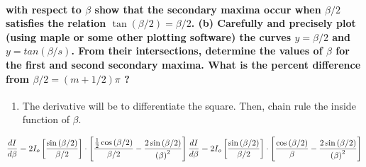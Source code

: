 \documentclass[11pt]{article}
\providecommand{\tightlist}{%
      \setlength{\itemsep}{0pt}\setlength{\parskip}{0pt}}
\begin{document}
\paragraph{\texorpdfstring{with respect to \(\beta\) show that the
secondary maxima occur when \(\beta/2\) satisfies the relation
\(\tan\left(\beta/2\right)=\beta/2\). (b) Carefully and precisely plot
(using maple or some other plotting software) the curves \(y=\beta/2\)
and \(y=tan\left(\beta/s\right)\). From their intersections, determine
the values of \(\beta\) for the first and second secondary maxima. What
is the percent difference from \(\beta/2=(m+1/2)\pi\)
?}{with respect to \textbackslash{}beta show that the secondary maxima occur when \textbackslash{}beta/2 satisfies the relation \textbackslash{}tan\textbackslash{}left(\textbackslash{}beta/2\textbackslash{}right)=\textbackslash{}beta/2. (b) Carefully and precisely plot (using maple or some other plotting software) the curves y=\textbackslash{}beta/2 and y=tan\textbackslash{}left(\textbackslash{}beta/s\textbackslash{}right). From their intersections, determine the values of \textbackslash{}beta for the first and second secondary maxima. What is the percent difference from \textbackslash{}beta/2=(m+1/2)\textbackslash{}pi ?}}\label{with-respect-to-beta-show-that-the-secondary-maxima-occur-when-beta2-satisfies-the-relation-tanleftbeta2rightbeta2.-b-carefully-and-precisely-plot-using-maple-or-some-other-plotting-software-the-curves-ybeta2-and-ytanleftbetasright.-from-their-intersections-determine-the-values-of-beta-for-the-first-and-second-secondary-maxima.-what-is-the-percent-difference-from-beta2m12pi}

\begin{enumerate}
\def\labelenumi{(\alph{enumi})}
\tightlist
\item
  The derivative will be to differentiate the square. Then, chain rule
  the inside function of \(\beta\).
\end{enumerate}

\[\begin{equation}
\frac{dI}{d\beta} = 2I_o\left[\frac{\sin\left(\beta/2\right)}{\beta/2}\right] \cdot \left[\frac{\frac{1}{2}\cos\left(\beta/2\right)}{\beta/2}-\frac{2\sin\left(\beta/2\right)}{\left(\beta\right)^2}\right]
\\
\\
\frac{dI}{d\beta} = 2I_o\left[\frac{\sin\left(\beta/2\right)}{\beta/2}\right] \cdot \left[\frac{\cos\left(\beta/2\right)}{\beta}-\frac{2\sin\left(\beta/2\right)}{\left(\beta\right)^2}\right]
\end{equation}\]
\end{document}
